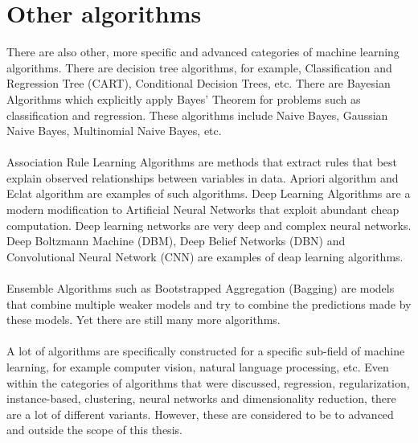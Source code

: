 \section{Other algorithms}
There are also other, more specific and advanced categories of machine learning algorithms. There are decision tree algorithms, for example, Classification and Regression Tree (CART), Conditional Decision Trees, etc. There are Bayesian Algorithms which explicitly apply Bayes’ Theorem for problems such as classification and regression. These algorithms include Naive Bayes, Gaussian Naive Bayes, Multinomial Naive Bayes, etc. \cite{mlcat} \\\\
Association Rule Learning Algorithms are methods that extract rules that best explain observed relationships between variables in data. Apriori algorithm and Eclat algorithm are examples of such algorithms. Deep Learning Algorithms are a modern modification to Artificial Neural Networks that exploit abundant cheap computation. Deep learning networks are very deep and complex neural networks. Deep Boltzmann Machine (DBM), Deep Belief Networks (DBN) and Convolutional Neural Network (CNN) are examples of deap learning algorithms.  \cite{mlcat}\\\\
Ensemble Algorithms such as Bootstrapped Aggregation (Bagging) are models that combine multiple weaker models and try to combine the predictions made by these models. Yet there are still many more algorithms.  \cite{mlcat}\\\\
A lot of algorithms are specifically constructed for a specific sub-field of machine learning, for example computer vision, natural language processing, etc. Even within the categories of algorithms that were discussed, regression, regularization, instance-based, clustering, neural networks and dimensionality reduction, there are a lot of different variants. However, these are considered to be to advanced and outside the scope of this thesis. 

